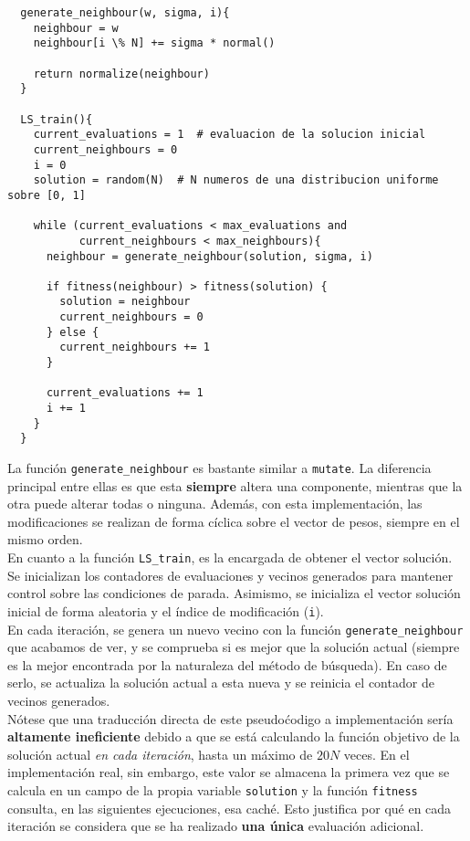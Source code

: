 \documentclass[11pt]{article}
\theoremstyle{plain}
\theoremstyle{definition}
\begin{document}
\begin{lstlisting}
  generate_neighbour(w, sigma, i){
    neighbour = w
    neighbour[i \% N] += sigma * normal()

    return normalize(neighbour)
  }

  LS_train(){
    current_evaluations = 1  # evaluacion de la solucion inicial
    current_neighbours = 0
    i = 0
    solution = random(N)  # N numeros de una distribucion uniforme sobre [0, 1]

    while (current_evaluations < max_evaluations and
           current_neighbours < max_neighbours){
      neighbour = generate_neighbour(solution, sigma, i)

      if fitness(neighbour) > fitness(solution) {
        solution = neighbour
        current_neighbours = 0
      } else {
        current_neighbours += 1
      }

      current_evaluations += 1
      i += 1
    }
  }
\end{lstlisting}

La función \texttt{generate\_neighbour} es bastante similar a \texttt{mutate}. La diferencia principal entre ellas es que esta \textbf{siempre} altera una componente, mientras que la otra puede alterar todas o ninguna. Además, con esta implementación, las modificaciones se realizan de forma cíclica sobre el vector de pesos, siempre en el mismo orden. \\

En cuanto a la función \texttt{LS\_train}, es la encargada de obtener el vector solución. Se inicializan los contadores de evaluaciones y vecinos generados para mantener control sobre las condiciones de parada. Asimismo, se inicializa el vector solución inicial de forma aleatoria y el índice de modificación (\texttt{i}). \\

En cada iteración, se genera un nuevo vecino con la función \texttt{generate\_neighbour} que acabamos de ver, y se comprueba si es mejor que la solución actual (siempre es la mejor encontrada por la naturaleza del método de búsqueda). En caso de serlo, se actualiza la solución actual a esta nueva y se reinicia el contador de vecinos generados. \\

Nótese que una traducción directa de este pseudoćodigo a implementación sería \textbf{altamente ineficiente} debido a que se está calculando la función objetivo de la solución actual \textit{en cada iteración}, hasta un máximo de $20N$ veces. En el implementación real, sin embargo, este valor se almacena la primera vez que se calcula en un campo de la propia variable \texttt{solution} y la función \texttt{fitness} consulta, en las siguientes ejecuciones, esa caché. Esto justifica por qué en cada iteración se considera que se ha realizado \textbf{una única} evaluación adicional. \\
\end{document}
